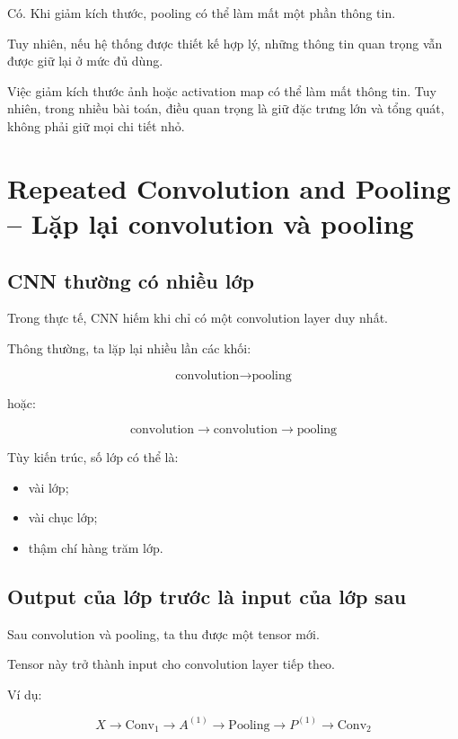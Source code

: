 Có. Khi giảm kích thước, pooling có thể làm mất một phần thông tin.

Tuy nhiên, nếu hệ thống được thiết kế hợp lý, những thông tin quan trọng vẫn được giữ lại ở mức đủ dùng.

\begin{luuy}
Việc giảm kích thước ảnh hoặc activation map có thể làm mất thông tin. Tuy nhiên, trong nhiều bài toán, điều quan trọng là giữ đặc trưng lớn và tổng quát, không phải giữ mọi chi tiết nhỏ.
\end{luuy}

\section{Repeated Convolution and Pooling -- Lặp lại convolution và pooling}

\subsection{CNN thường có nhiều lớp}

Trong thực tế, CNN hiếm khi chỉ có một convolution layer duy nhất.

Thông thường, ta lặp lại nhiều lần các khối:

\[
    \text{convolution}
    \rightarrow
    \text{pooling}
\]

hoặc:

\[
    \text{convolution}
    \rightarrow
    \text{convolution}
    \rightarrow
    \text{pooling}
\]

Tùy kiến trúc, số lớp có thể là:

\begin{itemize}
    \item vài lớp;
    \item vài chục lớp;
    \item thậm chí hàng trăm lớp.
\end{itemize}

\subsection{Output của lớp trước là input của lớp sau}

Sau convolution và pooling, ta thu được một tensor mới.

Tensor này trở thành input cho convolution layer tiếp theo.

Ví dụ:

\[
    X
    \rightarrow
    \text{Conv}_1
    \rightarrow
    A^{(1)}
    \rightarrow
    \text{Pooling}
    \rightarrow
    P^{(1)}
    \rightarrow
    \text{Conv}_2
\]

